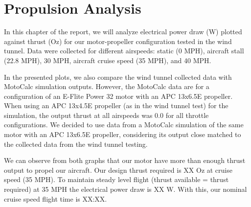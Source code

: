 \chapter{Propulsion Analysis} \label{cp:propulsion}



In this chapter of the report, we will analyze electrical power draw (W) plotted against thrust (Oz) for our motor-propeller configuration tested in the wind tunnel. Data were collected for different airspeeds: static (0 MPH), aircraft stall (22.8 MPH), 30 MPH, aircraft cruise speed (35 MPH), and 40 MPH.

In the presented plots, we also compare the wind tunnel collected data with MotoCalc simulation outputs. However, the MotoCalc data are for a configuration of an E-Flite Power 32 motor with an APC 13x6.5E propeller. When using an APC 13x4.5E propeller (as in the wind tunnel test) for the simulation, the output thrust at all airspeeds was 0.0 for all throttle configurations. We decided to use data from a MotoCalc simulation of the same motor with an APC 13x6.5E propeller, considering its output close matched to the collected data from the wind tunnel testing.


We can observe from both graphs that our motor have more than enough thrust output to propel our aircraft. Our design thrust required is XX Oz at cruise speed (35 MPH). To maintain steady level flight (thrust available = thrust required) at 35 MPH the electrical power draw is XX W. With this, our nominal cruise speed flight time is XX:XX.



